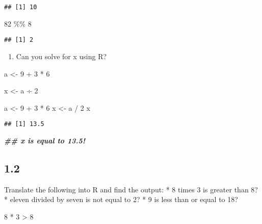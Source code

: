 \documentclass[
]{book}
\newenvironment{Shaded}{\begin{snugshade}}{\end{snugshade}}
\newcommand{\DecValTok}[1]{\textcolor[rgb]{0.00,0.00,0.81}{#1}}
\newcommand{\DocumentationTok}[1]{\textcolor[rgb]{0.56,0.35,0.01}{\textbf{\textit{#1}}}}
\newcommand{\NormalTok}[1]{#1}
\newcommand{\OtherTok}[1]{\textcolor[rgb]{0.56,0.35,0.01}{#1}}
\newcommand{\SpecialCharTok}[1]{\textcolor[rgb]{0.00,0.00,0.00}{#1}}
\providecommand{\tightlist}{%
  \setlength{\itemsep}{0pt}\setlength{\parskip}{0pt}}
\begin{document}
\begin{verbatim}
## [1] 10
\end{verbatim}

\begin{Shaded}
\begin{Highlighting}[]
\DecValTok{82} \SpecialCharTok{\%\%} \DecValTok{8}
\end{Highlighting}
\end{Shaded}

\begin{verbatim}
## [1] 2
\end{verbatim}

\begin{enumerate}
\def\labelenumi{\alph{enumi}.}
\setcounter{enumi}{1}
\tightlist
\item
  Can you solve for x using R?
\end{enumerate}

a \textless- 9 + 3 * 6

x \textless- a ÷ 2

\begin{Shaded}
\begin{Highlighting}[]
\NormalTok{a }\OtherTok{\textless{}{-}} \DecValTok{9} \SpecialCharTok{+} \DecValTok{3} \SpecialCharTok{*} \DecValTok{6}
\NormalTok{x }\OtherTok{\textless{}{-}}\NormalTok{ a }\SpecialCharTok{/} \DecValTok{2}
\NormalTok{x}
\end{Highlighting}
\end{Shaded}

\begin{verbatim}
## [1] 13.5
\end{verbatim}

\begin{Shaded}
\begin{Highlighting}[]
\DocumentationTok{\#\# x is equal to 13.5!}
\end{Highlighting}
\end{Shaded}

\hypertarget{section-1}{%
\subsection{1.2}\label{section-1}}

Translate the following into R and find the output:
* 8 times 3 is greater than 8?
* eleven divided by seven is not equal to 2?
* 9 is less than or equal to 18?

\begin{Shaded}
\begin{Highlighting}[]
\DecValTok{8} \SpecialCharTok{*} \DecValTok{3} \SpecialCharTok{\textgreater{}} \DecValTok{8}
\end{Highlighting}
\end{Shaded}
\end{document}

